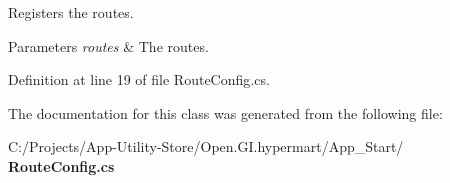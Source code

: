 Registers the routes. 


\begin{DoxyParams}{Parameters}
{\em routes} & The routes.\\
\hline
\end{DoxyParams}


Definition at line 19 of file Route\+Config.\+cs.



The documentation for this class was generated from the following file\+:\begin{DoxyCompactItemize}
\item 
C\+:/\+Projects/\+App-\/\+Utility-\/\+Store/\+Open.\+G\+I.\+hypermart/\+App\+\_\+\+Start/\textbf{ Route\+Config.\+cs}\end{DoxyCompactItemize}
